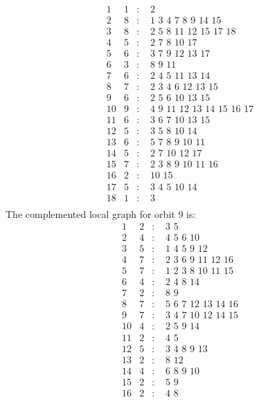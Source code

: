\documentclass[12pt]{article}
\begin{document}
\begin{equation*}
\begin{array}{rrcl}
1&1&:&\,\,2\\
2&8&:&\,\,1\,\,3\,\,4\,\,7\,\,8\,\,9\,\,14\,\,15\\
3&8&:&\,\,2\,\,5\,\,8\,\,11\,\,12\,\,15\,\,17\,\,18\\
4&5&:&\,\,2\,\,7\,\,8\,\,10\,\,17\\
5&6&:&\,\,3\,\,7\,\,9\,\,12\,\,13\,\,17\\
6&3&:&\,\,8\,\,9\,\,11\\
7&6&:&\,\,2\,\,4\,\,5\,\,11\,\,13\,\,14\\
8&7&:&\,\,2\,\,3\,\,4\,\,6\,\,12\,\,13\,\,15\\
9&6&:&\,\,2\,\,5\,\,6\,\,10\,\,13\,\,15\\
10&9&:&\,\,4\,\,9\,\,11\,\,12\,\,13\,\,14\,\,15\,\,16\,\,17\\
11&6&:&\,\,3\,\,6\,\,7\,\,10\,\,13\,\,15\\
12&5&:&\,\,3\,\,5\,\,8\,\,10\,\,14\\
13&6&:&\,\,5\,\,7\,\,8\,\,9\,\,10\,\,11\\
14&5&:&\,\,2\,\,7\,\,10\,\,12\,\,17\\
15&7&:&\,\,2\,\,3\,\,8\,\,9\,\,10\,\,11\,\,16\\
16&2&:&\,\,10\,\,15\\
17&5&:&\,\,3\,\,4\,\,5\,\,10\,\,14\\
18&1&:&\,\,3\\
\end{array}
\end{equation*}
The complemented local graph for orbit $9$ is:
\begin{equation*}
\begin{array}{rrcl}
1&2&:&\,\,3\,\,5\\
2&4&:&\,\,4\,\,5\,\,6\,\,10\\
3&5&:&\,\,1\,\,4\,\,5\,\,9\,\,12\\
4&7&:&\,\,2\,\,3\,\,6\,\,9\,\,11\,\,12\,\,16\\
5&7&:&\,\,1\,\,2\,\,3\,\,8\,\,10\,\,11\,\,15\\
6&4&:&\,\,2\,\,4\,\,8\,\,14\\
7&2&:&\,\,8\,\,9\\
8&7&:&\,\,5\,\,6\,\,7\,\,12\,\,13\,\,14\,\,16\\
9&7&:&\,\,3\,\,4\,\,7\,\,10\,\,12\,\,14\,\,15\\
10&4&:&\,\,2\,\,5\,\,9\,\,14\\
11&2&:&\,\,4\,\,5\\
12&5&:&\,\,3\,\,4\,\,8\,\,9\,\,13\\
13&2&:&\,\,8\,\,12\\
14&4&:&\,\,6\,\,8\,\,9\,\,10\\
15&2&:&\,\,5\,\,9\\
16&2&:&\,\,4\,\,8\\
\end{array}
\end{equation*}
\end{document}
